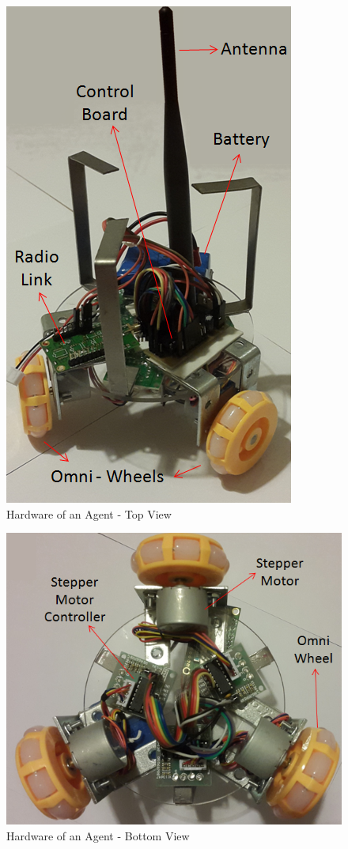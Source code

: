 \begin{figure}[H]
\caption{Hardware of an Agent - Top View} \label{topview_ref}
\centerline{\includegraphics[scale = 0.65]{hardware1}}
\end{figure} 

\begin{figure}[H]
\caption{Hardware of an Agent - Bottom View} \label{bottomview_ref}
\centerline{\includegraphics[scale = 0.65]{hardware2}}
\end{figure} 
		
